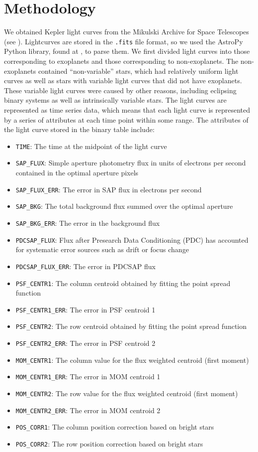 \documentclass{amsart}
\begin{document}
\section{Methodology}
We obtained Kepler light curves from the Mikulski Archive for Space Telescopes (see \cite{mast}). Lightcurves are stored in the \texttt{.fits} file format, so we used the AstroPy Python library, found at \cite{AstroPy}, to parse them. We first divided light curves into those corresponding to exoplanets and those corresponding to non-exoplanets. The non-exoplanets contained ``non-variable'' stars, which had relatively uniform light curves as well as stars with variable light curves that did not have exoplanets. These variable light curves were caused by other reasons, including eclipsing binary systems as well as intrinsically variable stars. The light curves are represented as time series data, which means that each light curve is represented by a series of attributes at each time point within some range. The attributes of the light curve stored in the binary table include:
\begin{itemize}
	\item \verb+TIME+: The time at the midpoint of the light curve
	\item \verb+SAP_FLUX+: Simple aperture photometry flux in units of electrons per second contained in the optimal aperture pixels
	\item \verb+SAP_FLUX_ERR+: The error in SAP flux in electrons per second
	\item \verb+SAP_BKG+: The total background flux summed over the optimal aperture
	\item \verb+SAP_BKG_ERR+: The error in the background flux
	\item \verb+PDCSAP_FLUX+: Flux after Presearch Data Conditioning (PDC) has accounted for systematic error sources such as drift or focus change
	\item \verb+PDCSAP_FLUX_ERR+: The error in PDCSAP flux
	\item \verb+PSF_CENTR1+: The column centroid obtained by fitting the point spread function
	\item \verb+PSF_CENTR1_ERR+: The error in PSF centroid 1
	\item \verb+PSF_CENTR2+: The row centroid obtained by fitting the point spread function
	\item \verb+PSF_CENTR2_ERR+: The error in PSF centroid 2
	\item \verb+MOM_CENTR1+: The column value for the flux weighted centroid (first moment)
	\item \verb+MOM_CENTR1_ERR+: The error in MOM centroid 1
	\item \verb+MOM_CENTR2+: The row value for the flux weighted centroid (first moment)
	\item \verb+MOM_CENTR2_ERR+: The error in MOM centroid 2
	\item \verb+POS_CORR1+: The column position correction based on bright stars 
	\item \verb+POS_CORR2+: The row position correction based on bright stars
\end{itemize}
\end{document}
